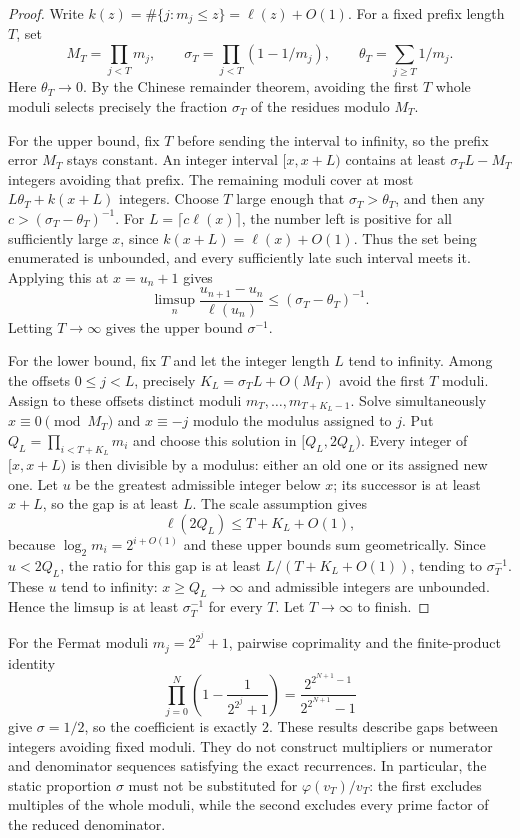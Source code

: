 \documentclass[11pt]{article}
\begin{document}
\begin{proof}
Write $k(z)=\#\{j:m_j\le z\}=\ell(z)+O(1)$. For a fixed prefix length
$T$, set
\[
 M_T=\prod_{j<T}m_j,\qquad
 \sigma_T=\prod_{j<T}(1-1/m_j),\qquad
 \theta_T=\sum_{j\ge T}1/m_j.
\]
Here $\theta_T\to0$. By the Chinese remainder theorem, avoiding the first
$T$ whole moduli selects precisely the fraction $\sigma_T$ of the
residues modulo $M_T$.

For the upper bound, fix $T$ before sending the interval to infinity,
so the prefix error $M_T$ stays constant. An integer interval
$[x,x+L)$ contains at least
$\sigma_TL-M_T$ integers avoiding that prefix. The remaining moduli
cover at most $L\theta_T+k(x+L)$ integers. Choose $T$ large enough that
$\sigma_T>\theta_T$, and then any
$c>(\sigma_T-\theta_T)^{-1}$.
For $L=\lceil c\ell(x)\rceil$, the number left is positive for all
sufficiently large $x$, since $k(x+L)=\ell(x)+O(1)$.
Thus the set being enumerated is unbounded, and every sufficiently late
such interval meets it. Applying this at $x=u_n+1$ gives
\[
 \limsup_n\frac{u_{n+1}-u_n}{\ell(u_n)}
 \le(\sigma_T-\theta_T)^{-1}.
\]
Letting $T\to\infty$ gives the upper bound $\sigma^{-1}$.

For the lower bound, fix $T$ and let the integer length $L$ tend to
infinity. Among the offsets $0\le j<L$, precisely
$K_L=\sigma_TL+O(M_T)$ avoid the first $T$ moduli.
Assign to these offsets distinct moduli
$m_T,\ldots,m_{T+K_L-1}$. Solve simultaneously
$x\equiv0\pmod{M_T}$ and $x\equiv-j$ modulo the modulus assigned to $j$.
Put $Q_L=\prod_{i<T+K_L}m_i$ and choose this solution in $[Q_L,2Q_L)$.
Every integer of $[x,x+L)$ is then divisible by a modulus: either an old
one or its assigned new one. Let $u$ be the greatest admissible integer
below $x$; its successor is at least $x+L$, so the gap is at least $L$.
The scale assumption gives
\[
 \ell(2Q_L)\le T+K_L+O(1),
\]
because $\log_2m_i=2^{i+O(1)}$ and these upper bounds sum geometrically.
Since $u<2Q_L$, the ratio for this gap is at least
$L/(T+K_L+O(1))$, tending to $\sigma_T^{-1}$.
These $u$ tend to infinity: $x\ge Q_L\to\infty$ and admissible integers
are unbounded. Hence the limsup is at least $\sigma_T^{-1}$ for every
$T$. Let $T\to\infty$ to finish.
\end{proof}

For the Fermat moduli $m_j=2^{2^j}+1$, pairwise coprimality and the
finite-product identity
\[
 \prod_{j=0}^{N}\left(1-\frac1{2^{2^j}+1}\right)
 =\frac{2^{2^{N+1}-1}}{2^{2^{N+1}}-1}
\]
give $\sigma=1/2$, so the coefficient is exactly $2$.
These results describe gaps between integers avoiding fixed moduli.
They do not construct multipliers or numerator and denominator sequences
satisfying the exact recurrences. In particular, the static proportion
$\sigma$ must not be substituted for $\varphi(v_T)/v_T$: the first
excludes multiples of the whole moduli, while the second excludes every
prime factor of the reduced denominator.
\end{document}
